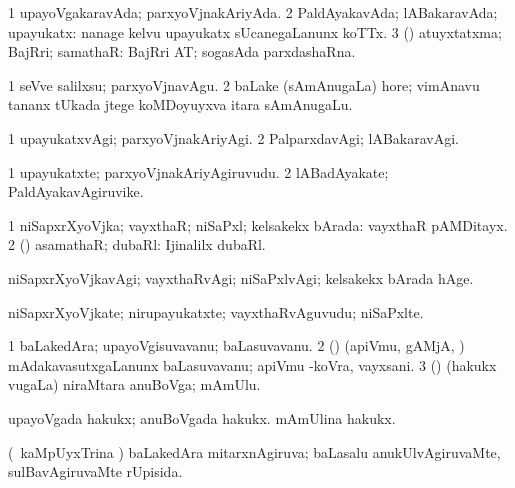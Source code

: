 {{{\bentry
{} 
\gl{\gu}
\expl{}
\bmng
\bnum
\num{1} upayoVgakaravAda; parxyoVjnakAriyAda. 
\num{2} PaldAyakavAda; lABakaravAda; upayukatx:  nanage kelvu upayukatx sUcanegaLanunx koTTx. 
\num{3} (\AmA) atuyxtatxma; BajRri; samathaR:  BajRri AT; sogasAda parxdashaRna. 
\enum
\emng

\noindent 
\gl{\pagu}
\expl{}
\bmng
\bnum
\num{1}  seVve salilxsu; parxyoVjnavAgu. 
\num{2}  baLake (sAmAnugaLa) hore; vimAnavu tananx tUkada jtege koMDoyuyxva itara sAmAnugaLu. 
\enum
\emng
\eentry

\bentry
{} 
\gl{\kirxvi}
\expl{}
\bmng
\bnum
\num{1} upayukatxvAgi; parxyoVjnakAriyAgi. 
\num{2} PalparxdavAgi; lABakaravAgi. 
\enum
\emng
\eentry

\bentry
{} 
\gl{\nA}
\expl{}
\bmng
\bnum
\num{1} upayukatxte; parxyoVjnakAriyAgiruvudu. 
\num{2} lABadAyakate; PaldAyakavAgiruvike. 
\enum
\emng
\eentry

\bentry
{} 
\gl{\gu}
\bmng
\bnum
\num{1} niSapxrXyoVjka; vayxthaR; niSaPxl; kelsakekx bArada:  vayxthaR pAMDitayx. 
\num{2} (\AmA) asamathaR; dubaRl:  Ijinalilx dubaRl. 
\enum
\emng
\eentry

\bentry
{} 
\gl{\kirxvi}
\expl{}
\bmng
niSapxrXyoVjkavAgi; vayxthaRvAgi; niSaPxlvAgi; kelsakekx bArada hAge. 
\emng
\eentry

\bentry
{} 
\gl{\nA}
\expl{}
\bmng
niSapxrXyoVjkate; nirupayukatxte; vayxthaRvAguvudu; niSaPxlte. 
\emng
\eentry

\bentry
{} 
\gl{\nA}
\bmng
\bnum
\num{1} baLakedAra; upayoVgisuvavanu; baLasuvavanu. 
\num{2} (\AmA) (apiVmu, gAMjA, \mo) mAdakavasutxgaLanunx baLasuvavanu; apiVmu -koVra, vayxsani. 
\num{3} (\nAyxshA) (hakukx \mo vugaLa) niraMtara anuBoVga; mAmUlu. 
\enum
\emng

\noindent
\gl{\pagu}
\expl{}
\bmng
{} 
\banum
{} upayoVgada hakukx; anuBoVgada hakukx. 
 mAmUlina hakukx. 
\eanum
\emng
\eentry

\bentry
{} 
\gl{\gu}
\expl{}
\bmng
(\kanmu\ kaMpUyxTrina \vi) baLakedAra mitarxnAgiruva; baLasalu anukUlvAgiruvaMte, sulBavAgiruvaMte rUpisida. 
\emng
\eentry

}}}
